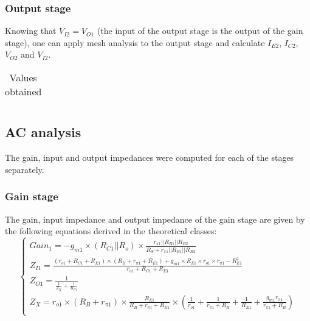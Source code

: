 \subsubsection{Output stage}
Knowing that $V_{I2}=V_{O1}$ (the input of the output stage is the output of the gain stage), one can apply mesh analysis to the output stage and calculate $I_{E2}$, $I_{C2}$, $V_{O2}$ and $V_{I2}$.

\begin{table}[H]
  \centering
  \begin{tabular}{|c|c|}
    \hline
      
  \end{tabular}
  \caption{Values obtained}
  \label{tab:resultsDC2}
\end{table}





\subsection{AC analysis}
The gain, input and output impedances were computed for each of the stages separately.

\subsubsection{Gain stage}
The gain, input impedance and output impedance of the gain stage are given by the following equations derived in the theoretical classes:
\begin{equation}
\begin{cases}
Gain_1 = -g_{m1} \times (R_{C1} || R_{o}) \times \frac{r_{\pi1} || R_{B1} || R_{B2}}{R_S+r_{\pi1} || R_{B1} || R_{B2}}\\
Z_{I1} = \frac{(r_{o1}+R_{C1}+R_{E1}) \times (R_B+r_{\pi 1}+R_{E1}) + g_{m1} \times R_{E1} \times r_{o1} \times r_{\pi 1} - R_{E1}^2}{r_{o1} + R_{C1} + R_{E1}} \\
Z_{O1} = \frac{1}{\frac{1}{Z_X}+\frac{1}{R_{C1}}} \\
Z_X = r_{o1} \times (R_B+r_{\pi 1}) \times \frac{R_{E1}}{R_B+r_{\pi 1}+R_{E1}} \times (\frac{1}{r_{o1}}+\frac{1}{r_{\pi 1}+R_B}+\frac{1}{R_{E1}}+  \frac{g_{m1} r_{\pi 1}}{r_{\pi 1}+R_B}) \\
\end{cases}
\end{equation}


